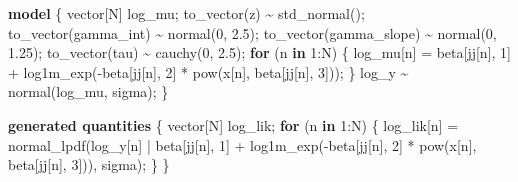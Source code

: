 \documentclass[
  12pt,
  letterpaper,
  DIV=11,
  numbers=noendperiod]{scrartcl}
\newenvironment{Shaded}{\begin{snugshade}}{\end{snugshade}}
\newcommand{\ControlFlowTok}[1]{\textcolor[rgb]{0.00,0.23,0.31}{\textbf{#1}}}
\newcommand{\DataTypeTok}[1]{\textcolor[rgb]{0.68,0.00,0.00}{#1}}
\newcommand{\DecValTok}[1]{\textcolor[rgb]{0.68,0.00,0.00}{#1}}
\newcommand{\FloatTok}[1]{\textcolor[rgb]{0.68,0.00,0.00}{#1}}
\newcommand{\KeywordTok}[1]{\textcolor[rgb]{0.00,0.23,0.31}{\textbf{#1}}}
\newcommand{\NormalTok}[1]{\textcolor[rgb]{0.00,0.23,0.31}{#1}}
\begin{document}
\begin{Shaded}
\begin{Highlighting}[]
\KeywordTok{model}\NormalTok{ \{}
  \DataTypeTok{vector}\NormalTok{[N] log\_mu;}
\NormalTok{  to\_vector(z) \textasciitilde{} std\_normal();}
\NormalTok{  to\_vector(gamma\_int) \textasciitilde{} normal(}\DecValTok{0}\NormalTok{, }\FloatTok{2.5}\NormalTok{);}
\NormalTok{  to\_vector(gamma\_slope) \textasciitilde{} normal(}\DecValTok{0}\NormalTok{, }\FloatTok{1.25}\NormalTok{);}
\NormalTok{  to\_vector(tau) \textasciitilde{} cauchy(}\DecValTok{0}\NormalTok{, }\FloatTok{2.5}\NormalTok{);}
  \ControlFlowTok{for}\NormalTok{ (n }\ControlFlowTok{in} \DecValTok{1}\NormalTok{:N) \{}
\NormalTok{    log\_mu[n] = beta[jj[n], }\DecValTok{1}\NormalTok{] + log1m\_exp({-}beta[jj[n], }\DecValTok{2}\NormalTok{] * pow(x[n], beta[jj[n], }\DecValTok{3}\NormalTok{]));}
\NormalTok{  \}}
\NormalTok{  log\_y \textasciitilde{} normal(log\_mu, sigma);}
\NormalTok{\}}

\KeywordTok{generated quantities}\NormalTok{ \{}
  \DataTypeTok{vector}\NormalTok{[N] log\_lik;}
  \ControlFlowTok{for}\NormalTok{ (n }\ControlFlowTok{in} \DecValTok{1}\NormalTok{:N) \{}
\NormalTok{    log\_lik[n] = normal\_lpdf(log\_y[n] |}
\NormalTok{      beta[jj[n], }\DecValTok{1}\NormalTok{] + log1m\_exp({-}beta[jj[n], }\DecValTok{2}\NormalTok{] * pow(x[n], beta[jj[n], }\DecValTok{3}\NormalTok{])),}
\NormalTok{      sigma);}
\NormalTok{  \}}
\NormalTok{\}}
\end{Highlighting}
\end{Shaded}
\end{document}
